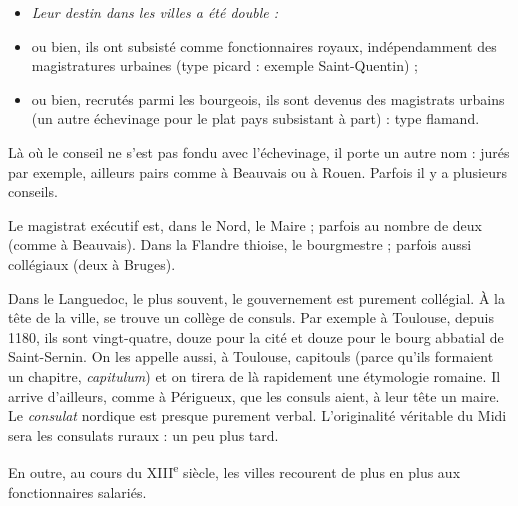 \documentclass[french,twoside]{book} %
\newlength{\listmod}
\newcommand{\listhead}[1]{\hspace{-1\listmod}\emph{#1}}
\begin{document}
\begin{itemize}[itemsep=0pt,]
\item[]\listhead{Leur destin dans les villes a été double :}
\item ou bien, ils ont subsisté comme fonctionnaires royaux, indépendamment des magistratures urbaines (type picard : exemple Saint-Quentin) ;
\item ou bien, recrutés parmi les bourgeois, ils sont devenus des magistrats urbains (un autre échevinage pour le plat pays subsistant à part) : type flamand.
\end{itemize}
\noindent Là où le conseil ne s’est pas fondu avec l’échevinage, il porte un autre nom : jurés par exemple, ailleurs pairs comme à Beauvais ou à Rouen. Parfois il y a plusieurs conseils.\par
Le magistrat exécutif est, dans le Nord, le Maire ; parfois au nombre de deux (comme à Beauvais). Dans la Flandre thioise, le bourgmestre ; parfois aussi collégiaux (deux à Bruges).\par
Dans le Languedoc, le plus souvent, le gouvernement est purement collégial. À la tête de la ville, se trouve un collège de consuls. Par exemple à Toulouse, depuis 1180, ils sont vingt-quatre, douze pour la cité et douze pour le bourg abbatial de Saint-Sernin. On les appelle aussi, à Toulouse, capitouls (parce qu’ils formaient un chapitre, {\itshape capitulum}) et on tirera de là rapidement une étymologie romaine. Il arrive d’ailleurs, comme à Périgueux, que les  
\label{p76} consuls aient, à leur tête un maire. Le \emph{consulat} nordique est presque purement verbal. L’originalité véritable du Midi sera les consulats ruraux : un peu plus tard.\par
En outre, au cours du XIII\textsuperscript{e} siècle, les villes recourent de plus en plus aux fonctionnaires salariés.\par
\end{document}
